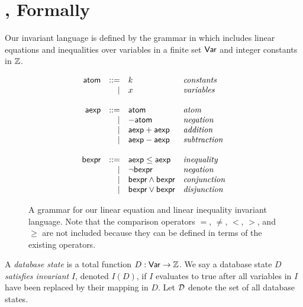\section{\iconfluence{}, Formally}\label{sec:formalism}
Our invariant language is defined by the grammar in 
which includes linear equations and inequalities over variables in a finite set
$\textsf{Var}$ and integer constants in $\mathbb{Z}$.

\begin{figure}[h]
  \centering

  \newcommand{\atom}{\textsf{atom}}
  \newcommand{\aexp}{\textsf{aexp}}
  \newcommand{\bexp}{\textsf{bexpr}}
  \begin{gather*}
    \begin{array}{rrll}
      \atom & ::= & k & \text{\emph{constants}} \\
            & |   & x & \text{\emph{variables}} \\
      &&& \\
      \aexp  & ::= & \atom         & \text{\emph{atom}} \\
             & |   & -\atom        & \text{\emph{negation}} \\
             & |   & \aexp + \aexp & \text{\emph{addition}} \\
             & |   & \aexp - \aexp & \text{\emph{subtraction}} \\
      &&& \\
      \bexp  & ::= & \aexp \leq \aexp  & \text{\emph{inequality}} \\
             & |   & \lnot \bexp       & \text{\emph{negation}} \\
             & |   & \bexp \land \bexp & \text{\emph{conjunction}} \\
             & |   & \bexp \lor \bexp  & \text{\emph{disjunction}} \\
    \end{array}
  \end{gather*}

  \caption{
    A grammar for our linear equation and linear inequality invariant language.
    Note that the comparison operators $=$, $\neq$, $<$, $>$, and $\geq$ are
    not included because they can be defined in terms of the existing
    operators.
  }
  \label{fig:invariant-grammar}
\end{figure}

A \emph{database state} is a total function $D: \textsf{Var} \to \mathbb{Z}$.  We say a
database state $D$ \emph{satisfies invariant} $I$, denoted $I(D)$, if $I$
evaluates to true after all variables in $I$ have been replaced by their
mapping in $D$. Let $\mathcal{D}$ denote the set of all database states.

